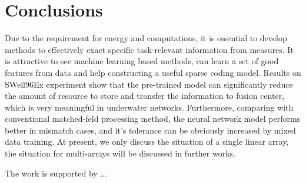 \section{Conclusions}
Due to the requirement for energy and computations, it is essential to develop methods to effectively exact specific task-relevant information from measures.
It is attractive to see machine learning based methods, can learn a set of good features from data and help constructing a useful sparse coding model.
Results on SWell96Ex experiment show that the pre-trained model can significantly reduce the amount of resource to store and transfer the information to fusion center, which is very meaningful in underwater networks. Furthermore, comparing with conventional matched-feld processing method, the neural network model performs better in mismatch cases, and it's tolerance can be obviously increased by mixed data training.
At present, we only discuss the situation of a single linear array, the situation for multi-arrays will be discussed in further works.

\begin{acks}
The work is supported by ...

\end{acks}
